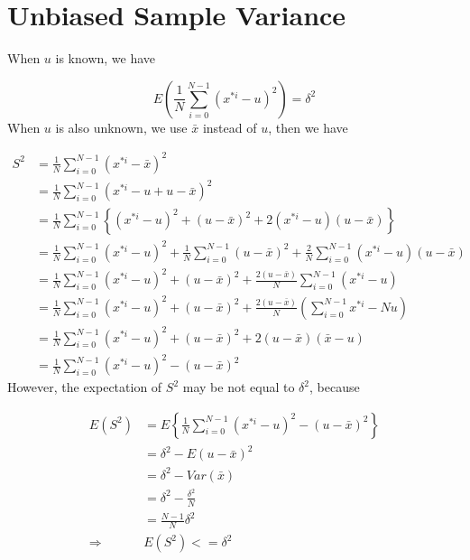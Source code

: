 \documentclass[runningheads,openany]{xhlPaper}
\begin{document}
\section{Unbiased Sample Variance}
When $u$ is known, we have

\begin{displaymath}
E\left ( \frac{1}{N}\sum_{i=0}^{N-1}{\left ( x^{*i}-u \right )^2} \right )=\delta^2
\end{displaymath}
When $u$ is also unknown, we use $\bar{x}$ instead of $u$, then we have

\begin{displaymath}
\begin{aligned}
S^2 &= \frac{1}{N}\sum_{i=0}^{N-1}{\left ( x^{*i}- \bar{x} \right )^2}\\
&=\frac{1}{N}\sum_{i=0}^{N-1}{\left ( x^{*i}- u + u -\bar{x} \right )^2}\\
&=\frac{1}{N}\sum_{i=0}^{N-1}\left \{ {\left ( x^{*i}- u\right )^2} + \left (  u -\bar{x}  \right )^2 +2\left ( x^{*i}- u \right )\left ( u -\bar{x} \right )\right \} \\
&=\frac{1}{N}\sum_{i=0}^{N-1}{\left ( x^{*i}- u\right )^2}+\frac{1}{N}\sum_{i=0}^{N-1}{\left ( u -\bar{x}\right )^2}+\frac{2}{N}\sum_{i=0}^{N-1}\left ( x^{*i}- u \right )\left ( u -\bar{x} \right )\\
&=\frac{1}{N}\sum_{i=0}^{N-1}{\left ( x^{*i}- u\right )^2}+\left ( u -\bar{x}\right )^2+\frac{2\left ( u -\bar{x} \right )}{N}\sum_{i=0}^{N-1}\left ( x^{*i}- u \right )\\
&=\frac{1}{N}\sum_{i=0}^{N-1}{\left ( x^{*i}- u\right )^2}+\left ( u -\bar{x}\right )^2+\frac{2\left ( u -\bar{x} \right )}{N}\left ( \sum_{i=0}^{N-1}x^{*i}- Nu \right )\\
&=\frac{1}{N}\sum_{i=0}^{N-1}{\left ( x^{*i}- u\right )^2}+\left ( u -\bar{x}\right )^2+2\left ( u -\bar{x} \right )\left ( \bar{x}- u \right )\\
&=\frac{1}{N}\sum_{i=0}^{N-1}{\left ( x^{*i}- u\right )^2}-\left ( u -\bar{x}\right )^2
\end{aligned}
\end{displaymath}
However, the expectation of $S^2$ may be not equal to $\delta ^2$, because

\begin{displaymath}
\begin{aligned}
E\left ( S^2 \right )&=E\left \{  \frac{1}{N}\sum_{i=0}^{N-1}{\left ( x^{*i}- u\right )^2}-\left ( u -\bar{x}\right )^2\right \}\\
&=\delta ^2 - E\left ( u -\bar{x} \right )^2\\
&=\delta ^2 - Var\left ( \bar{x} \right )\\
&=\delta ^2 - \frac{\delta ^2}{N}\\
&=\frac{N-1}{N}\delta ^2\\
\Rightarrow \ &E\left ( S^2 \right ) <= \delta ^2
\end{aligned}
\end{displaymath}
\end{document}

